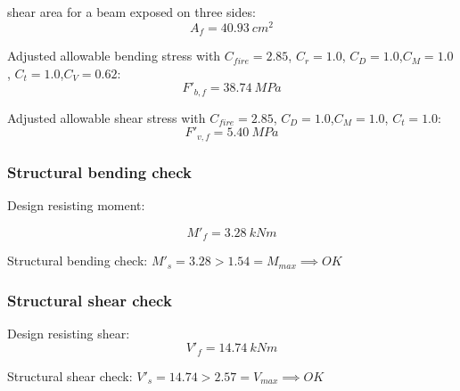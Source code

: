 \documentclass[a4paper,11pt]{xc_memo}
\begin{document}
\noindent shear area for a beam exposed on three sides:
\begin{equation}
  A_f= 40.93\ cm^2
\end{equation}

\noindent Adjusted allowable bending stress with $C_{fire}= 2.85$, $C_r= 1.0$, $C_D= 1.0$,$C_M= 1.0$, $C_t= 1.0$,$C_V= 0.62$:
\begin{equation}
  F'_{b,f}= 38.74\ MPa
\end{equation}

\noindent Adjusted allowable shear stress with  $C_{fire}= 2.85$, $C_D= 1.0$,$C_M= 1.0$, $C_t= 1.0$:
\begin{equation}
  F'_{v,f}= 5.40\ MPa
\end{equation}

\subsubsection{Structural bending check}

\noindent Design resisting moment:

\begin{equation}
  M'_f= 3.28\ kN m
\end{equation}

\noindent Structural bending check: $M'_s = 3.28 > 1.54 = M_{max} \implies OK$

\subsubsection{Structural shear check}

\noindent Design resisting shear:
\begin{equation}
  V'_f= 14.74\ kN m
\end{equation}

\noindent Structural shear check: $V'_s = 14.74 > 2.57 = V_{max} \implies OK$
\end{document}
